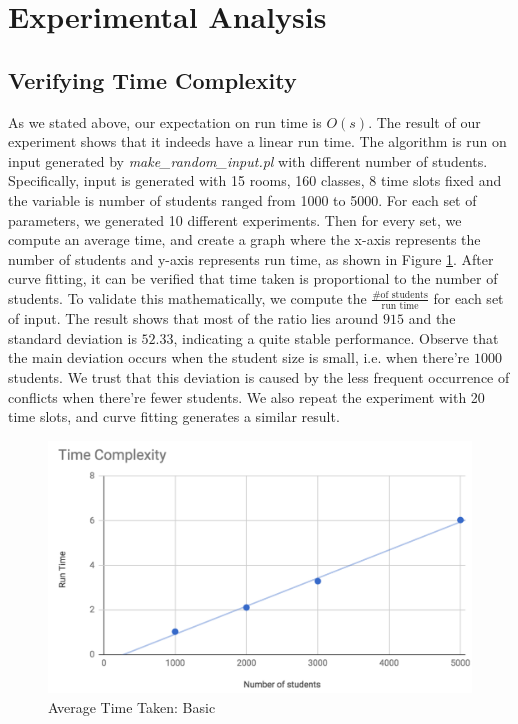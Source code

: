 \documentclass[11pt, oneside]{article}   	%
\begin{document}
 \section{Experimental Analysis}
 \subsection{Verifying Time Complexity}
As we stated above, our expectation on run time is $O(s)$. The result of our experiment shows that it indeeds have a linear run time. The algorithm is run on input generated by \textit{make\_random\_input.pl} with different number of students. Specifically, input is generated with 15 rooms, 160 classes, 8 time slots fixed and the variable is number of students ranged from 1000 to 5000. For each set of parameters, we generated 10 different experiments. Then for every set, we compute an average time, and create a graph where the x-axis represents the number of students and y-axis represents run time, as shown in Figure \ref{timechart}. After curve fitting, it can be verified that time taken is proportional to the number of students. To validate this mathematically, we compute the $\frac{\text{\# of students}}{\text{run time}}$ for each set of input. The result shows that most of the ratio lies around $915$ and the standard deviation is $52.33$, indicating a quite stable performance. Observe that the main deviation occurs when the student size is small, i.e. when there're $1000$ students. We trust that this deviation is caused by the less frequent occurrence of conflicts when there're fewer students. We also repeat the experiment with 20 time slots, and curve fitting generates a similar result.
 \begin{figure}[H]
 \centering
 \includegraphics[scale =.6]{time-input}
 \caption{Average Time Taken: Basic}
 \label{timechart}
 \end{figure}\par
\end{document}
